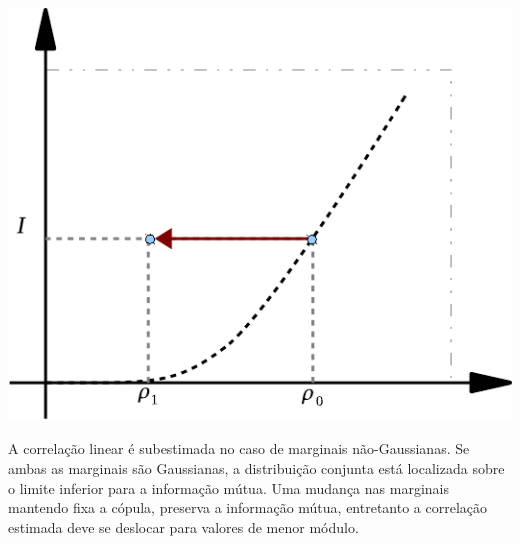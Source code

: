 \begin{marginfigure}
 \includegraphics[width = \textwidth]{./figuras/fig1-mod.pdf} 
 \caption[ A correlação linear é subestimada no caso de marginais não-Gaussianas.]{A correlação linear é subestimada no caso de marginais não-Gaussianas. Se ambas as marginais são Gaussianas, a distribuição conjunta está localizada sobre o limite inferior para a informação mútua. Uma mudança nas marginais mantendo fixa a cópula, preserva a informação mútua, entretanto a correlação estimada deve se deslocar para valores de menor módulo.}
 \label{fig:correlinfomutua}
\end{marginfigure}

